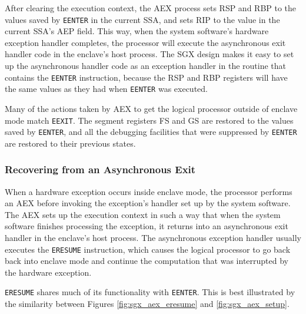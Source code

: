 
After clearing the execution context, the AEX process sets RSP and RBP to the
values saved by \texttt{EENTER} in the current SSA, and sets RIP to the value
in the current SSA's AEP field. This way, when the system software's hardware
exception handler completes, the processor will execute the asynchronous exit
handler code in the enclave's host process. The SGX design makes it easy to
set up the asynchronous handler code as an exception handler in the routine
that contains the \texttt{EENTER} instruction, because the RSP and RBP
registers will have the same values as they had when \texttt{EENTER} was
executed.

Many of the actions taken by AEX to get the logical processor outside of
enclave mode match \texttt{EEXIT}. The segment registers FS and GS are restored
to the values saved by \texttt{EENTER}, and all the debugging facilities that
were suppressed by \texttt{EENTER} are restored to their previous states.


\subsubsection{Recovering from an Asynchronous Exit}
\label{sec:sgx_eresume}

When a hardware exception occurs inside enclave mode, the processor performs
an AEX before invoking the exception's handler set up by the system software.
The AEX sets up the execution context in such a way that when the system
software finishes processing the exception, it returns into an asynchronous
exit handler in the enclave's host process. The asynchronous exception handler
usually executes the \texttt{ERESUME} instruction, which causes the logical
processor to go back back into enclave mode and continue the computation that
was interrupted by the hardware exception.

\texttt{ERESUME} shares much of its functionality with \texttt{EENTER}. This is
best illustrated by the similarity between Figures
\ref{fig:sgx_aex_eresume} and \ref{fig:sgx_aex_setup}.

